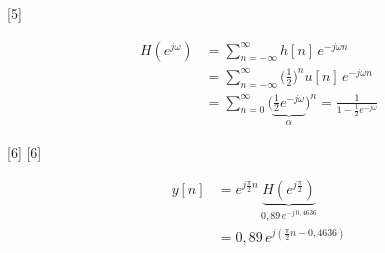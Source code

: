 \documentclass[11pt,a4paper]{article}
\begin{document}
[5]

\begin{align*}
H(e^{j\omega}) &= \sum_{n=-\infty}^{\infty} h[n]\,e^{-j\omega n}\\
&= \sum_{n=-\infty}^{\infty} \big(\tfrac{1}{2}\big)^{n}u[n]\,e^{-j\omega n}\\
&= \sum_{n=0}^{\infty} \Big(\underbrace{\tfrac{1}{2}e^{-j\omega}}_{\alpha}\Big)^{n} = \frac{1}{1-\frac{1}{2}e^{-j\omega}}
\end{align*}

[6]
[6]

\begin{align*}
y[n] &= e^{j\frac{\pi}{2}n}\,\underbrace{H(e^{j\frac{\pi}{2}})}_{0{,}89\,e^{-j\,0{,}4636}}\\
&= 0{,}89\,e^{j\left(\frac{\pi}{2}n-0{,}4636\right)}
\end{align*}
\end{document}
